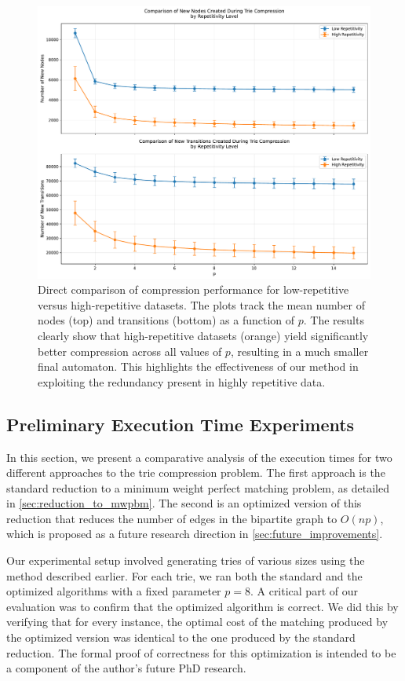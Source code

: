 \begin{figure}[H]
    \centering
    \includegraphics[width=1\linewidth]{Immagini/high_low_comparison.pdf}
    \caption{Direct comparison of compression performance for low-repetitive versus high-repetitive datasets. The plots track the mean number of nodes (top) and transitions (bottom) as a function of $p$. The results clearly show that high-repetitive datasets (orange) yield significantly better compression across all values of $p$, resulting in a much smaller final automaton. This highlights the effectiveness of our method in exploiting the redundancy present in highly repetitive data.}
    \label{fig:exp_comparison}
\end{figure}

\subsection{Preliminary Execution Time Experiments}
In this section, we present a comparative analysis of the execution times for two different approaches to the trie compression problem. The first approach is the standard reduction to a minimum weight perfect matching problem, as detailed in \cref{sec:reduction_to_mwpbm}. The second is an optimized version of this reduction that reduces the number of edges in the bipartite graph to $O(np)$, which is proposed as a future research direction in \cref{sec:future_improvements}.

Our experimental setup involved generating tries of various sizes using the method described earlier. For each trie, we ran both the standard and the optimized algorithms with a fixed parameter $p=8$. A critical part of our evaluation was to confirm that the optimized algorithm is correct. We did this by verifying that for every instance, the optimal cost of the matching produced by the optimized version was identical to the one produced by the standard reduction. The formal proof of correctness for this optimization is intended to be a component of the author's future PhD research.

